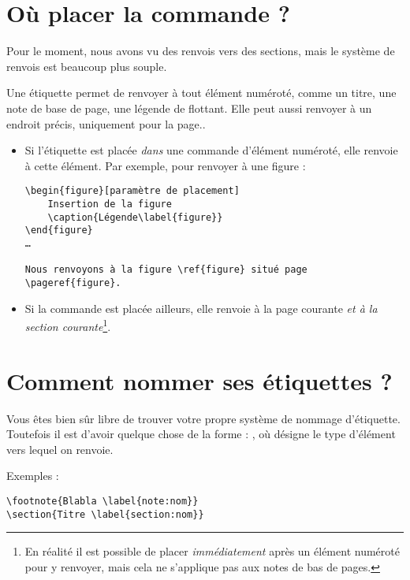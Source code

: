 \section{Où placer la commande  ?}

Pour le moment, nous avons vu des renvois vers des sections, mais le système de renvois est beaucoup plus souple.

Une étiquette permet de renvoyer à tout élément numéroté, comme un titre, une note de base de page, une légende de flottant. Elle peut aussi renvoyer à un endroit précis, uniquement pour la page..

\begin{itemize}
\item Si l'étiquette  est placée \emph{dans}  une commande  d'élément numéroté, elle renvoie à cette élément. Par exemple, pour renvoyer à une figure  :
\begin{verbatim}
\begin{figure}[paramètre de placement]
	Insertion de la figure
	\caption{Légende\label{figure}}
\end{figure} 
…

Nous renvoyons à la figure \ref{figure} situé page \pageref{figure}.
\end{verbatim}
\item Si la commande est placée ailleurs, elle renvoie à la page courante \emph{et à la section courante}\footnote{En réalité il est possible de placer \emph{immédiatement} après un élément numéroté pour y renvoyer, mais cela ne s'applique pas aux notes de bas de pages.}.
\end{itemize}

\section{Comment nommer ses étiquettes ?}

Vous êtes bien sûr libre de trouver votre propre système de nommage d'étiquette. Toutefois il est d'avoir quelque chose de la forme : , où  désigne le type d'élément vers lequel on renvoie.

Exemples :

\begin{verbatim}
\footnote{Blabla \label{note:nom}}
\section{Titre \label{section:nom}}
\end{verbatim}


